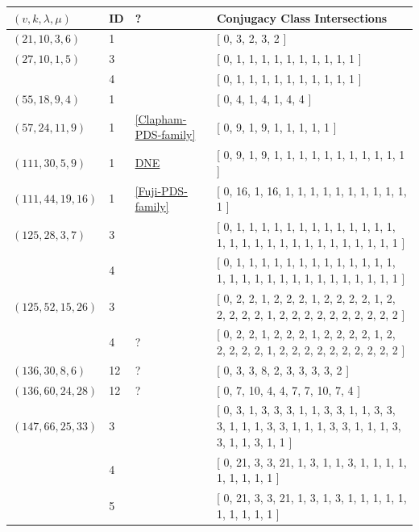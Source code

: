 \documentclass[12pt]{amsproc} %
\theoremstyle{definition}\newtheorem{defn}[thm]{Definition}
\theoremstyle{definition}\newtheorem{rem}[thm]{Remark}
\theoremstyle{definition}\newtheorem{ex}[thm]{Example}
\begin{document}
\begin{center}
	\begin{longtable}{p{3.66cm}|P{0.8cm}|P{0.69cm}|p{10cm}}
		 $(v, k, \lambda, \mu)$ & ID & ?  & Conjugacy Class Intersections \\
		\hline
		 $(21, 10, 3, 6)$  & 1 & \cite{pol-dav-smi-swa} & [ 0, 3, 2, 3, 2 ] \\
		\hline
		 $(27, 10, 1, 5)$  & 3 & \cite{Kantor_1986} & [ 0, 1, 1, 1, 1, 1, 1, 1, 1, 1, 1 ] \\
		   & 4 & \cite{Swartz_2015} & [ 0, 1, 1, 1, 1, 1, 1, 1, 1, 1, 1 ] \\
		\hline
		 $(55, 18, 9, 4)$  & 1 & \cite{pol-dav-smi-swa} & [ 0, 4, 1, 4, 1, 4, 4 ] \\
		\hline
		 $(57, 24, 11, 9)$  & 1 & \ref{Clapham-PDS-family} & [ 0, 9, 1, 9, 1, 1, 1, 1, 1 ] \\
		\hline
		 $(111, 30, 5, 9)$  & 1 & \hyperref[rem:111]{\footnotesize DNE} & [ 0, 9, 1, 9, 1, 1, 1, 1, 1, 1, 1, 1, 1, 1, 1 ] \\
		\hline
		 $(111, 44, 19, 16)$  & 1 & \ref{Fuji-PDS-family} & [ 0, 16, 1, 16, 1, 1, 1, 1, 1, 1, 1, 1, 1, 1, 1 ] \\
		\hline
		 $(125, 28, 3, 7)$  & 3 & \cite{Kantor_1986} & [ 0, 1, 1, 1, 1, 1, 1, 1, 1, 1, 1, 1, 1, 1, 1, 1, 1, 1, 1, 1, 1, 1, 1, 1, 1, 1, 1, 1, 1 ] \\
		   & 4 & \cite{Swartz_2015} & [ 0, 1, 1, 1, 1, 1, 1, 1, 1, 1, 1, 1, 1, 1, 1, 1, 1, 1, 1, 1, 1, 1, 1, 1, 1, 1, 1, 1, 1 ] \\
		\hline
		 $(125, 52, 15, 26)$  & 3 & \cite{pol-dav-smi-swa} & [ 0, 2, 2, 1, 2, 2, 2, 1, 2, 2, 2, 2, 1, 2, 2, 2, 2, 2, 1, 2, 2, 2, 2, 2, 2, 2, 2, 2, 2 ] \\
		   & 4 & ? & [ 0, 2, 2, 1, 2, 2, 2, 1, 2, 2, 2, 2, 1, 2, 2, 2, 2, 2, 1, 2, 2, 2, 2, 2, 2, 2, 2, 2, 2 ] \\
		\hline
		 $(136, 30, 8, 6)$  & 12 & ? & [ 0, 3, 3, 8, 2, 3, 3, 3, 3, 2 ] \\
		\hline
		 $(136, 60, 24, 28)$  & 12 & ? & [ 0, 7, 10, 4, 4, 7, 7, 10, 7, 4 ] \\
		\hline
		 $(147, 66, 25, 33)$  & 3 & \cite{brady} & [ 0, 3, 1, 3, 3, 3, 1, 1, 3, 3, 1, 1, 3, 3, 3, 1, 1, 1, 3, 3, 1, 1, 1, 3, 3, 1, 1, 1, 3, 3, 1, 1, 3, 1, 1 ] \\
		   & 4 & \cite{brady} & [ 0, 21, 3, 3, 21, 1, 3, 1, 1, 3, 1, 1, 1, 1, 1, 1, 1, 1, 1 ] \\
		   & 5 & \cite{brady} & [ 0, 21, 3, 3, 21, 1, 3, 1, 3, 1, 1, 1, 1, 1, 1, 1, 1, 1, 1 ] \\

\end{longtable}
\end{center}
\end{document}
